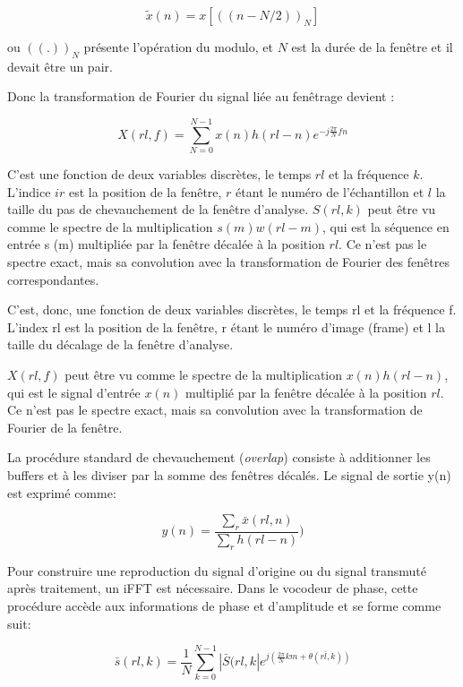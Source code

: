 \begin{equation}
    \tilde{x}(n) = x[((n-N/2))_N] 
\end{equation}

ou $((.))_N$ présente l'opération du modulo, et $N$ est la durée de la fenêtre et il devait être un pair.


Donc la transformation de Fourier du signal liée au fenêtrage devient :

\begin{equation}
    X(rl,f) = \sum_{N=0}^{N-1} x(n) h(rl-n) e^{-j \frac{2 \pi}{N} fn}
\end{equation}

C'est une fonction de deux variables discrètes, le temps $ rl $ et la fréquence $ k $. L'indice $ ir $ est la position de la fenêtre, $r$ étant le numéro de l’échantillon et $l$ la taille du pas de chevauchement de la fenêtre d'analyse. $ S (rl, k) $ peut être vu comme le spectre de la multiplication $ s (m) w (rl-m) $, qui est la séquence en entrée s (m) multipliée par la fenêtre décalée à la position $ rl $. Ce n'est pas le spectre exact, mais sa convolution avec la transformation de Fourier des fenêtres correspondantes.

C’est, donc, une fonction de deux variables discrètes, le temps rl et la fréquence f. L’index rl
est la position de la fenêtre, r étant le numéro d’image (frame) et l la taille du décalage de la
fenêtre d’analyse.

$ X (rl, f) $ peut être vu comme le spectre de la multiplication $ x (n) h (rl-n) $, qui est le signal d'entrée $ x (n) $ multiplié par la fenêtre décalée à la position $ rl $. Ce n'est pas le spectre exact, mais sa convolution avec la transformation de Fourier de la fenêtre.

La procédure standard de chevauchement (\textit{overlap}) consiste à additionner les buffers et à les diviser par la somme des fenêtres décalés. Le signal de sortie y(n) est exprimé comme:

\begin{equation}
    y(n) = \frac{\sum_r \bar{x}(rl,n)}{\sum_r {h}(rl - n)})
\end{equation}

Pour construire une reproduction du signal d'origine ou du signal transmuté après traitement, un iFFT est nécessaire. Dans le vocodeur de phase, cette procédure accède aux informations de phase et d'amplitude et se forme comme suit:

\begin{equation}
    \bar{s}(rl,k) = \frac{1}{N}\sum_{k=0}^{N-1} |\bar{S}(rl,k| e^{j (\frac{2 \pi}{N} km + \theta(r \bar{l},k))}
\end{equation}

